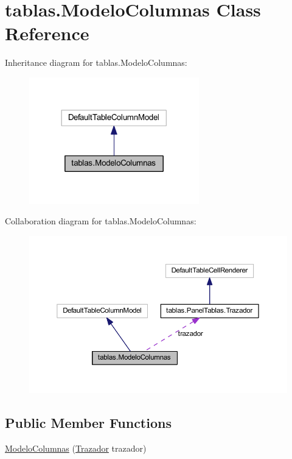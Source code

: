 \hypertarget{classtablas_1_1_modelo_columnas}{}\section{tablas.\+Modelo\+Columnas Class Reference}
\label{classtablas_1_1_modelo_columnas}


Inheritance diagram for tablas.\+Modelo\+Columnas\+:
\nopagebreak
\begin{figure}[H]
\begin{center}
\leavevmode
\includegraphics[width=209pt]{classtablas_1_1_modelo_columnas__inherit__graph}
\end{center}
\end{figure}


Collaboration diagram for tablas.\+Modelo\+Columnas\+:
\nopagebreak
\begin{figure}[H]
\begin{center}
\leavevmode
\includegraphics[width=350pt]{classtablas_1_1_modelo_columnas__coll__graph}
\end{center}
\end{figure}
\subsection*{Public Member Functions}
\begin{DoxyCompactItemize}
\item 
\mbox{\hyperlink{classtablas_1_1_modelo_columnas_a52fadcf02ccc30520130e4a7a4b827f9}{Modelo\+Columnas}} (\mbox{\hyperlink{classtablas_1_1_panel_tablas_1_1_trazador}{Trazador}} trazador)
\end{DoxyCompactItemize}


